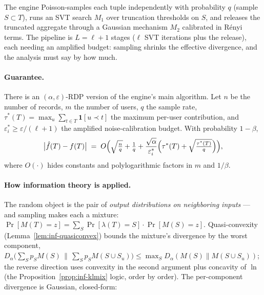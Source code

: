 The engine Poisson-samples each tuple independently with probability $q$ (sample
$S \subset T$), runs an SVT search $M_1$ over truncation thresholds on $S$, and
releases the truncated aggregate through a Gaussian mechanism $M_2$ calibrated in
R\'enyi terms. The pipeline is $L = \ell + 1$ stages ($\ell$ SVT iterations plus the
release), each needing an amplified budget: sampling shrinks the effective
divergence, and the analysis must say by how much.

\paragraph{Guarantee.}

\begin{corollary}
\label{cor:inf-s4s-rdp}
There is an $(\alpha, \varepsilon)$-RDP version of the engine's main algorithm. Let $n$
be the number of records, $m$ the number of users, $q$ the sample rate,
$\tau^*(T) = \max_u \sum_{t \in T}\mathbf{1}[u \prec t]$ the maximum per-user
contribution, and $\varepsilon_i^* \ge \varepsilon/(\ell+1)$ the amplified
noise-calibration budget. With probability $1 - \beta$,
\[
\bigl|\hat f(T) - f(T)\bigr|
\;=\; O\Bigl(\sqrt{\tfrac{n}{q}} + \tfrac{1}{q} +
\frac{\sqrt{\alpha}}{\varepsilon_i^*}\Bigl(\tau^*(T) + \sqrt{\tfrac{\tau^*(T)}{q}}\Bigr)\Bigr),
\]
where $O(\cdot)$ hides constants and polylogarithmic factors in $m$ and $1/\beta$. \eop
\end{corollary}

\paragraph{How information theory is applied.}
The random object is the pair of \emph{output distributions on neighboring inputs} ---
and sampling makes each a mixture:
$\Pr[M(T) = z] = \sum_S \Pr[\lambda(T){=}S]\cdot\Pr[M(S) = z]$. Quasi-convexity
(Lemma~\ref{lem:inf-quasiconvex}) bounds the mixture's divergence by the worst
component, $D_\alpha\bigl(\sum_S p_S M(S) \,\|\, \sum_S p_S M(S \cup S_u)\bigr) \le
\max_S D_\alpha(M(S) \| M(S \cup S_u))$; the reverse direction uses convexity in the
second argument plus concavity of $\ln$ (the Proposition~\ref{prop:inf-klmix} logic,
order by order). The per-component divergence is Gaussian, closed-form:

